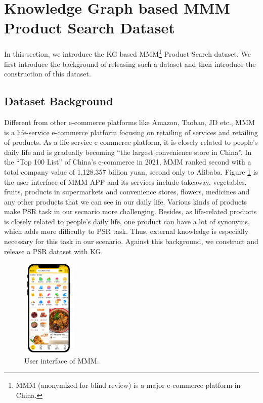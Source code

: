 \section{Knowledge Graph based MMM Product Search Dataset}

In this section, we introduce the KG based MMM\footnote{MMM (anonymized for blind review) is a major e-commerce platform in China.} Product Search dataset. We first introduce the background of releasing such a dataset and then introduce the construction of this dataset.

\subsection{Dataset Background}

Different from other e-commerce platforms like Amazon, Taobao, JD etc., MMM is a life-service e-commerce platform focusing on retailing of services and retailing of products. As a life-service e-commerce platform, it is closely related to people's daily life and is gradually becoming ``the largest convenience store in China''. In the ``Top 100 List'' of China's e-commerce in 2021, MMM ranked second with a total company value of 1,128.357 billion yuan, second only to Alibaba. Figure \ref{fig:meituan} is the user interface of MMM APP and its services include takeaway, vegetables, fruits, products in supermarkets and convenience stores, flowers, medicines and any other products that we can see in our daily life. Various kinds of products make PSR task in our secnario more challenging. Besides, as life-related products is closely related to people's daily life, one product can have a lot of synonyms, which adds more difficulty to PSR task. Thus, external knowledge is especially necessary for this task in our scenario. Against this background, we construct and release a PSR dataset with KG. 

\begin{figure}[th] \centering
    \includegraphics[width=0.23\textwidth]{meituan_app}
    \caption{User interface of MMM.}
    \label{fig:meituan}
\end{figure}

